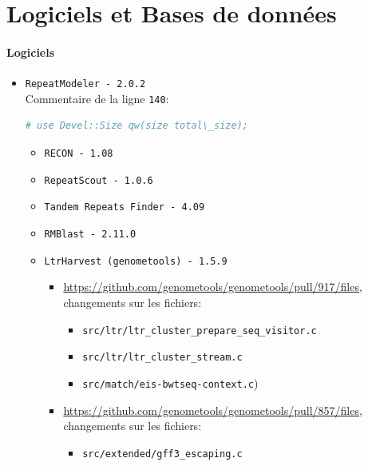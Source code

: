 \documentclass[10pt]{article}
\begin{document}

\newpage

\section*{Logiciels et Bases de données}

\paragraph{Logiciels}
\begin{itemize}
    \item \texttt{RepeatModeler - 2.0.2} \\
    Commentaire de la ligne \texttt{140}:%
\begin{lstlisting}[language=perl]
 # use Devel::Size qw(size total\_size);
\end{lstlisting}
    \begin{itemize}
        \item \texttt{RECON - 1.08} %
        \item \texttt{RepeatScout - 1.0.6} %
        \item \texttt{Tandem Repeats Finder - 4.09} %
        \item \texttt{RMBlast - 2.11.0} %
        \item \texttt{LtrHarvest (genometools) - 1.5.9} %
        \begin{itemize}
            \item \url{https://github.com/genometools/genometools/pull/917/files}, changements sur les fichiers:
            \begin{itemize}
                \item \texttt{src/ltr/ltr\_cluster\_prepare\_seq\_visitor.c}
                \item \texttt{src/ltr/ltr\_cluster\_stream.c}
                \item \texttt{src/match/eis-bwtseq-context.c})
            \end{itemize} 
            \item \url{https://github.com/genometools/genometools/pull/857/files}, changements sur les fichiers:
            \begin{itemize}
                \item \texttt{src/extended/gff3\_escaping.c}

\end{itemize}
\end{itemize}
\end{itemize}
\end{itemize}
\end{document}
